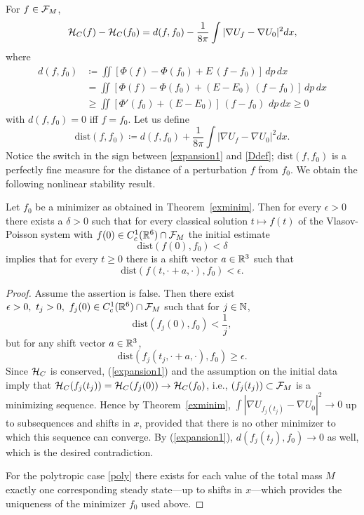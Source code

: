 \documentclass[11pt]{article}
\begin{document}
For $f \in {\cal F}_M$, 
\begin{equation} \label{expansion1}
  {\cal H}_C (f)- {\cal H}_C (f_0)=d(f,f_0)-\frac{1}{8 \pi}
  \int|\nabla U_f - \nabla U_0|^2 dx, 
\end{equation}
where 
\begin{align*}
  d(f,f_0)
  &\coloneqq
  \iint \left[\Phi(f)-\Phi(f_0) + E\, (f-f_0)\right]\,dp\,dx\\
  &= 
  \iint \left[\Phi(f)-\Phi(f_0) + (E-E_0)\, (f-f_0)\right]\,dp\,dx\\
  &\geq
  \iint \left[ \Phi'(f_0) + (E - E_0)\right]
  \,(f-f_0)\,\,dp\,dx \geq 0
\end{align*}
with $d(f,f_0)=0$ iff $f=f_0$. Let us define
\begin{equation} \label{Ddef}
  \mathrm{dist}(f,f_0) \coloneqq d(f,f_0) + \frac{1}{8 \pi}
  \int|\nabla U_f - \nabla U_0|^2 dx.
\end{equation}
Notice the switch in the sign between \eqref{expansion1} and \eqref{Ddef};
$\mathrm{dist}(f,f_0)$ is a perfectly fine measure for the distance of
a perturbation $f$ from $f_0$.
We obtain the following nonlinear stability result.
%
%
\begin{theorem}\label{stabilitygal}
  Let $f_0$ be a minimizer as obtained in Theorem~\ref{exminim}.
  Then for every $\epsilon>0$ there exists a $\delta>0$ such that for every
  classical solution $t \mapsto f(t)$ of the Vlasov-Poisson system 
  with $f(0) \in C^1_c (\mathbb R^6)\cap {\cal F}_M$ 
  the initial estimate
  \[
  \mathrm{dist}(f(0),f_0) < \delta
  \]
  implies that for every $t\geq 0$ there is a shift vector
  $a\in \mathbb R^3$ such that
  \[
  \mathrm{dist}(f(t,\cdot + a,\cdot),f_0) < \epsilon.
  \]
\end{theorem}
%
\begin{proof}
  Assume the assertion is false. Then there exist 
  $\epsilon>0,\ t_j>0,\ f_j(0) \in C^1_c (\mathbb R^6)\cap {\cal F}_M$ such that
  for $j\in \mathbb N$,
  \[
  \mathrm{dist}(f_j(0),f_0) < \frac{1}{j},
  \]
  but for any shift vector $a\in \mathbb R^3$,
  \[
  \mathrm{dist}(f_j(t_j,\cdot + a,\cdot),f_0) \geq \epsilon.
  \]
  Since ${\cal H}_C$ is conserved, (\ref{expansion1}) and the assumption on 
  the initial data imply that
  ${\cal H}_C (f_j(t_j)) =  {\cal H}_C (f_j(0)) \to {\cal H}_C (f_0)$,
  i.e., $(f_j(t_j)) \subset  {\cal F}_M$ is a minimizing sequence.
  Hence by Theorem~\ref{exminim},
  $\int |\nabla U_{{f_j}(t_j)}-\nabla U_0|^2\to 0$ 
  up to subsequences and shifts in $x$, provided that there is
  no other minimizer to which this sequence can converge.
  By (\ref{expansion1}), 
  $d(f_j(t_j),f_0)\to 0$ as well, which is the desired
  contradiction.

  For the polytropic case \eqref{poly} there exists for each value
  of the total mass $M$ exactly one corresponding steady state---up to
  shifts in $x$---which provides the uniqueness of the minimizer $f_0$
  used above.
\end{proof}
\end{document}
